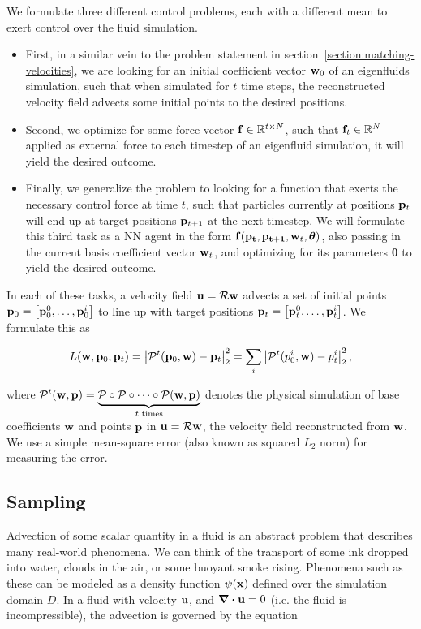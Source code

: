We formulate three different control problems, each with a different mean to
exert control over the fluid simulation.
\begin{itemize}
  \item First, in a similar vein to the problem statement in
    section~\ref{section:matching-velocities}, we are looking for an initial
    coefficient vector $\vb{w}_0$ of an eigenfluids simulation, such that when
    simulated for $t$ time steps, the reconstructed velocity field advects some
    initial points to the desired positions.
  \item Second, we optimize for some force vector $\vb{f}\in \mathbb{R}^{t\times
    N}$, such that $\vb{f}_t \in \mathbb{R}^N$ applied as external force to each
    timestep of an eigenfluid simulation, it will yield the desired outcome.
  \item Finally, we generalize the problem to looking for a function that exerts
    the necessary control force at time $t$, such that particles currently at
    positions $\vb{p}_t$ will end up at target positions $\vb{p}_{t+1}$ at the
    next timestep. We will formulate this third task as a \acf{NN} agent in the
    form $\vb{f}(\vb{p_t}, \vb{p_{t+1}}, \vb{w}_{t}, \boldsymbol\theta)$, also
    passing in the current basis coefficient vector $\vb{w}_t$, and optimizing
    for its parameters $\boldsymbol\theta$ to yield the desired outcome.
\end{itemize}

In each of these tasks, a velocity field $\vb{u} = \mathcal{R}\vb{w}$ advects
a set of initial points $\vb{p}_0 = \left[\vb{p}_0^0,\dots, \vb{p}_0^i\right]$
to line up with target positions $\vb{p}_t = \left[\vb{p}_t^0, \dots,
\vb{p}_t^i\right]$.  We formulate this as 

\begin{equation}
  L(\vb{w}, \vb{p}_0, \vb{p}_t)
  = \left| \mathcal{P}^{t}(\vb{p}_0, \vb{w}) - \vb{p}_t\right|_2^2 
  = \sum_{i}\left|\mathcal{P}^{t}(p_0^i, \vb{w}) - p_t^i\right|_2^2, 
\end{equation}

where $\mathcal{P}^t(\vb{w}, \vb{p}) = \underbrace{\mathcal{P} \circ
\mathcal{P}\circ \dots \circ \mathcal{P}(\vb{w}, \vb{p})}_{t \text{ times}}$
denotes the physical simulation of base coefficients $\vb{w}$ and points
$\vb{p}$ in $\vb{u} = \mathcal{R}\vb{w}$, the velocity field reconstructed from
$\vb{w}$.  We use a simple mean-square error (also known as squared $L_2$ norm)
for measuring the error.

\subsection*{Sampling}
Advection of some scalar quantity in a fluid is an abstract problem that
describes many real-world phenomena. We can think of the transport of some ink
dropped into water, clouds in the air, or some buoyant smoke rising. Phenomena
such as these can be modeled as a density function $\psi(\vb{x})$ defined over
the simulation domain $D$. In a fluid with velocity $\vb{u}$, and $\div{\vb{u}}
= 0$ (i.e. the fluid is incompressible), the advection is governed by the
equation

